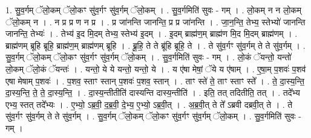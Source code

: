 \documentclass[17pt]{extarticle}
\begin{document}
1. सु॒व॒र्गम् ॅलो॒कम् ॅलो॒कꣳ सु॑व॒र्गꣳ सु॑व॒र्गम् ॅलो॒कम् । . सु॒व॒र्गमिति॑ सुवः - गम् । . लो॒कम् न न लो॒कम् ॅलो॒कम् न । . न प्र प्र ण न प्र । . प्र जा॑नन्ति जानन्ति॒ प्र प्र जा॑नन्ति । . जा॒न॒न्ति॒ तेभ्य॒ स्तेभ्यो॑ जानन्ति जानन्ति॒ तेभ्यः॑ । . तेभ्य॑ इ॒द मि॒दम् तेभ्य॒ स्तेभ्य॑ इ॒दम् । . इ॒दम् ब्राह्म॑ण॒म् ब्राह्म॑ण मि॒द मि॒दम् ब्राह्म॑णम् । . ब्राह्म॑णम् ब्रूहि ब्रूहि॒ ब्राह्म॑ण॒म् ब्राह्म॑णम् ब्रूहि । . ब्रू॒हि॒ ते ते ब्रू॑हि ब्रूहि॒ ते । . ते सु॑व॒र्गꣳ सु॑व॒र्गम् ते ते सु॑व॒र्गम् । . सु॒व॒र्गम् ॅलो॒कम् ॅलो॒कꣳ सु॑व॒र्गꣳ सु॑व॒र्गम् ॅलो॒कम् । . सु॒व॒र्गमिति॑ सुवः - गम् । . लो॒कं ॅयन्तो॒ यन्तो॑ लो॒कम् ॅलो॒कं ॅयन्तः॑ । . यन्तो॒ ये ये यन्तो॒ यन्तो॒ ये । . य ए॑षा मेषां॒ ॅये य ए॑षाम् । . ए॒षा॒म् प॒शवः॑ प॒शव॑ एषा मेषाम् प॒शवः॑ । . प॒शव॒ स्ताꣳ स्तान् प॒शवः॑ प॒शव॒ स्तान् । . ताꣳ स्ते॑ ते॒ ताꣳ स्ताꣳ स्ते᳚ । . ते॒ दा॒स्य॒न्ति॒ दा॒स्य॒न्ति॒ ते॒ ते॒ दा॒स्य॒न्ति॒ । . दा॒स्य॒न्तीतीति॑ दास्यन्ति दास्य॒न्तीति॑ । . इति॒ तत् तदितीति॒ तत् । . तदे᳚भ्य एभ्य॒ स्तत् तदे᳚भ्यः । . ए॒भ्यो॒ ऽब्र॒वी॒ द॒ब्र॒वी॒ दे॒भ्य॒ ए॒भ्यो॒ ऽब्र॒वी॒त् । . अ॒ब्र॒वी॒त् ते ते᳚ ऽब्रवी दब्रवी॒त् ते । . ते सु॑व॒र्गꣳ सु॑व॒र्गम् ते ते सु॑व॒र्गम् । . सु॒व॒र्गम् ॅलो॒कम् ॅलो॒कꣳ सु॑व॒र्गꣳ सु॑व॒र्गम् ॅलो॒कम् । . सु॒व॒र्गमिति॑ सुवः - गम् । \newline
\end{document}

